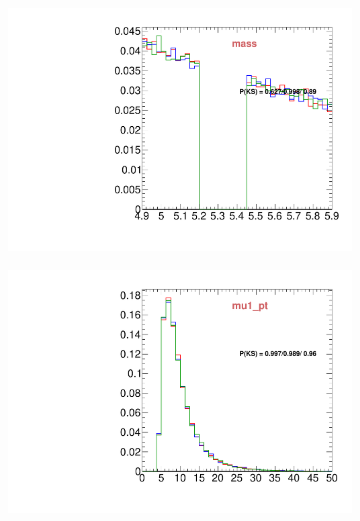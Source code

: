 \begin{figure}
\begin{subfigure}[b]{0.2\textwidth}
                \includegraphics[width=\textwidth]{Figures/VariablesComparison/Data_barrel_figs_3h/mass}
                \label{fig:Data_barrel_mass_3h}
        \end{subfigure}
        \begin{subfigure}[b]{0.2\textwidth}
                \centering
                \includegraphics[width=\textwidth]{Figures/VariablesComparison/Data_barrel_figs_3h/mu1_pt}
                \label{fig:Data_barrel_mu1_pt_3h}
        \end{subfigure}
        \begin{subfigure}[b]{0.2\textwidth}
                \centering

\end{subfigure}
\end{figure}
